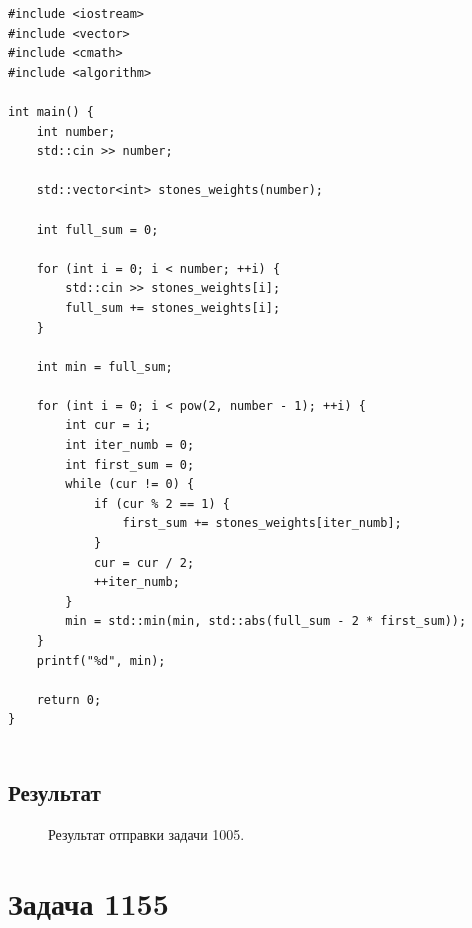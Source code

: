 \documentclass[a5paper, 10pt]{article}
\theoremstyle{definition}
\theoremstyle{plain}
\theoremstyle{remark}
\begin{document}
\begin{center}
\begin{lstlisting}[label=some-code,caption={Исходный код для 1005}]
#include <iostream>
#include <vector>
#include <cmath>
#include <algorithm>

int main() {
    int number;
    std::cin >> number;

    std::vector<int> stones_weights(number);

    int full_sum = 0;

    for (int i = 0; i < number; ++i) {
        std::cin >> stones_weights[i];
        full_sum += stones_weights[i];
    }

    int min = full_sum;

    for (int i = 0; i < pow(2, number - 1); ++i) {
        int cur = i;
        int iter_numb = 0;
        int first_sum = 0;
        while (cur != 0) {
            if (cur % 2 == 1) {
                first_sum += stones_weights[iter_numb];
            }
            cur = cur / 2;
            ++iter_numb;
        }
        min = std::min(min, std::abs(full_sum - 2 * first_sum));
    }
    printf("%d", min);

    return 0;
}


\end{lstlisting}
\end{center}

\subsection{Результат}
\begin{figure}[h]
\caption{Результат отправки задачи 1005.}
\end{figure}


\newpage
\section{Задача 1155}
\end{document}
